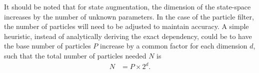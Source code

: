 \documentclass[nomenclature, english, bibtex]{kththesis}
\begin{document}
It should be noted that for state augmentation, the dimension of the state-space increases by the number of unknown parameters. In the case of the particle filter, the number of particles will need to be adjusted to maintain accuracy. A simple heuristic, instead of analytically deriving the exact dependency, could be to have the base number of particles $P$ increase by a common factor for each dimension $d$, such that the total number of particles needed $N$ is
\begin{align}
N &= P \times 2^d.
\end{align}
\end{document}
